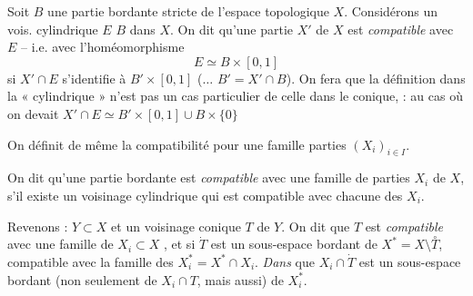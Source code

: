 \documentclass[11pt,a4paper]{article}
\begin{document}
Soit $B$ une partie bordante stricte de l'espace topologique $X$. Considérons un vois. cylindrique $E$   $B$ dans $X$. On dit qu'une partie  $X'$ de $X$ est \emph{compatible} avec $E$ -- i.e. avec l'homéomorphisme
\[
E\simeq B\times[0,1]
\]
si $X'\cap E$ s'identifie à $B'\times[0,1]$ ($\ldots$ $B'=X'\cap B$). On fera  que la définition dans la «    cylindrique » n'est pas un cas particulier de celle dans le   conique, \struck{\ill{}}    :  au cas où on \uncertain{\ill{}} devait \struck{\uncertain{\ill{}}} $X'\cap E\simeq B'\times[0,1]\cup B\times\lbrace0\rbrace$ 


On définit de même la compatibilité pour une famille   parties $(X_i)_{i\in I}$.



On dit qu'une partie bordante   est \emph{compatible} avec une famille de parties $X_i$ de $X$, s'il existe un voisinage cylindrique  qui est compatible avec chacune des $X_i$.


Revenons : $Y\subset X$ et un voisinage conique  $T$ de $Y$. On dit que $T$ est  \emph{compatible} avec une famille de $X_i\subset X$ , et si $\dot T$ est un sous-espace bordant de $X^{*}=X\setminus\overset{\circ}{T}$, compatible avec la famille des $X_i^{*}=X^{*}\cap X_i$. \emph{Dans}   que $X_i\cap\dot T$ est un sous-espace bordant (non seulement de $X_i\cap T$, mais aussi) de $X_i^{*}$.
\end{document}
